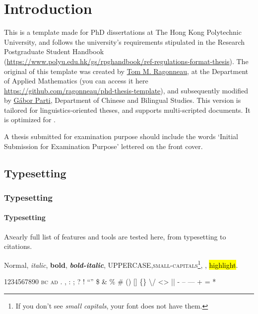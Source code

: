 \chapter{Introduction}
\label{sec:test}

This is a template made for PhD dissertations at The Hong Kong Polytechnic University, and follows the university's requirements stipulated in the Research Postgraduate Student Handbook (\url{https://www.polyu.edu.hk/gs/rpghandbook/ref-regulations-format-thesis}). The original of this  template was created by \href{https://github.com/ragonneau}{Tom M. Ragonneau}, at the Department of Applied Mathematics (you can access it here \url{https://github.com/ragonneau/phd-thesis-template}), and subsequently modified by \href{https://github.com/partigabor}{Gábor Parti}, Department of Chinese and Bilingual Studies. This version is tailored for linguistics-oriented theses, and supports multi-scripted documents. It is optimized for .

A thesis submitted for examination purpose should include the words ‘Initial Submission for Examination Purpose’ lettered on the front cover.

\section{Typesetting}
\subsection{Typesetting}
\subsubsection{Typesetting}

\lettrine[lines=5, slope=0.5em, lraise=0, nindent=1em, findent=-1em]{\textcolor{\accentcolor}{A}} nearly full list of features and tools are tested here, from typesetting to citations. \blindtext

\medskip 

Normal, \textit{italic}, \textbf{bold}, \textbf{\textit{bold-italic}}, UPPERCASE,\textsc{small-capitals}\footnote{If you don't see \emph{small capitals}, your font does not have them.}, , \hl{highlight}.

\medskip

1234567890      \textsc{bc} \textsc{ad} . , : ; ? ! ``'' \$ \& \% \# () [] \{\} \textbackslash / <> || - -- --- + = *

